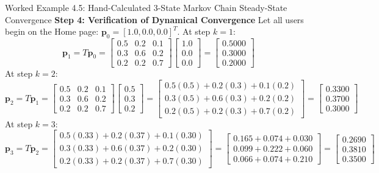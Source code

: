 \begin{examplebox}{Worked Example 4.5: Hand-Calculated 3-State Markov Chain Steady-State Convergence}
\textbf{Step 4: Verification of Dynamical Convergence}
Let all users begin on the Home page: $\mathbf{p}_0 = [1.0, 0.0, 0.0]^T$.
At step $k = 1$:
\begin{equation*}
\mathbf{p}_1 = T \mathbf{p}_0 = \begin{bmatrix} 0.5 & 0.2 & 0.1 \\ 0.3 & 0.6 & 0.2 \\ 0.2 & 0.2 & 0.7 \end{bmatrix} \begin{bmatrix} 1.0 \\ 0.0 \\ 0.0 \end{bmatrix} = \begin{bmatrix} \mathbf{0.5000} \\ \mathbf{0.3000} \\ \mathbf{0.2000} \end{bmatrix}
\end{equation*}
At step $k = 2$:
\begin{equation*}
\mathbf{p}_2 = T \mathbf{p}_1 = \begin{bmatrix} 0.5 & 0.2 & 0.1 \\ 0.3 & 0.6 & 0.2 \\ 0.2 & 0.2 & 0.7 \end{bmatrix} \begin{bmatrix} 0.5 \\ 0.3 \\ 0.2 \end{bmatrix} = \begin{bmatrix} 0.5(0.5) + 0.2(0.3) + 0.1(0.2) \\ 0.3(0.5) + 0.6(0.3) + 0.2(0.2) \\ 0.2(0.5) + 0.2(0.3) + 0.7(0.2) \end{bmatrix} = \begin{bmatrix} \mathbf{0.3300} \\ \mathbf{0.3700} \\ \mathbf{0.3000} \end{bmatrix}
\end{equation*}
At step $k = 3$:
\begin{equation*}
\mathbf{p}_3 = T \mathbf{p}_2 = \begin{bmatrix} 0.5(0.33) + 0.2(0.37) + 0.1(0.30) \\ 0.3(0.33) + 0.6(0.37) + 0.2(0.30) \\ 0.2(0.33) + 0.2(0.37) + 0.7(0.30) \end{bmatrix} = \begin{bmatrix} 0.165 + 0.074 + 0.030 \\ 0.099 + 0.222 + 0.060 \\ 0.066 + 0.074 + 0.210 \end{bmatrix} = \begin{bmatrix} \mathbf{0.2690} \\ \mathbf{0.3810} \\ \mathbf{0.3500} \end{bmatrix}

\end{equation*}
\end{examplebox}
